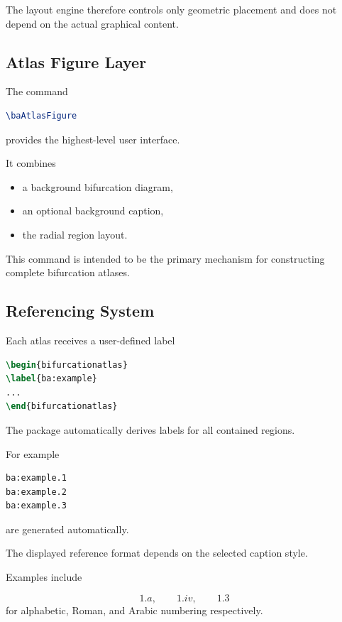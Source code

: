 The layout engine therefore controls only geometric placement and does not depend on the actual graphical content.

\subsection{Atlas Figure Layer}

The command

\begin{lstlisting}[language=LaTeX]
\baAtlasFigure
\end{lstlisting}

provides the highest-level user interface.

It combines

\begin{itemize}
\item a background bifurcation diagram,
\item an optional background caption,
\item the radial region layout.
\end{itemize}

This command is intended to be the primary mechanism for constructing complete bifurcation atlases.

\subsection{Referencing System}

Each atlas receives a user-defined label

\begin{lstlisting}[language=LaTeX]
\begin{bifurcationatlas}
\label{ba:example}
...
\end{bifurcationatlas}
\end{lstlisting}

The package automatically derives labels for all contained regions.

For example

\begin{lstlisting}[language=LaTeX]
ba:example.1
ba:example.2
ba:example.3
\end{lstlisting}

are generated automatically.

The displayed reference format depends on the selected caption style.

Examples include


\begin{equation*}
    1.a,\qquad
1.iv,\qquad
1.3
\end{equation*}
for alphabetic, Roman, and Arabic numbering respectively.

